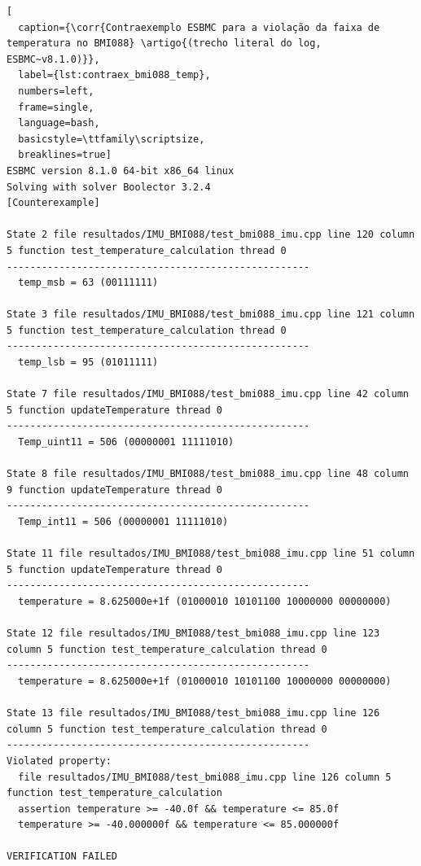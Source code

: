 \begin{lstlisting}[
  caption={\corr{Contraexemplo ESBMC para a violação da faixa de temperatura no BMI088} \artigo{(trecho literal do log, ESBMC~v8.1.0)}},
  label={lst:contraex_bmi088_temp},
  numbers=left,
  frame=single,
  language=bash,
  basicstyle=\ttfamily\scriptsize,
  breaklines=true]
ESBMC version 8.1.0 64-bit x86_64 linux
Solving with solver Boolector 3.2.4
[Counterexample]

State 2 file resultados/IMU_BMI088/test_bmi088_imu.cpp line 120 column 5 function test_temperature_calculation thread 0
----------------------------------------------------
  temp_msb = 63 (00111111)

State 3 file resultados/IMU_BMI088/test_bmi088_imu.cpp line 121 column 5 function test_temperature_calculation thread 0
----------------------------------------------------
  temp_lsb = 95 (01011111)

State 7 file resultados/IMU_BMI088/test_bmi088_imu.cpp line 42 column 5 function updateTemperature thread 0
----------------------------------------------------
  Temp_uint11 = 506 (00000001 11111010)

State 8 file resultados/IMU_BMI088/test_bmi088_imu.cpp line 48 column 9 function updateTemperature thread 0
----------------------------------------------------
  Temp_int11 = 506 (00000001 11111010)

State 11 file resultados/IMU_BMI088/test_bmi088_imu.cpp line 51 column 5 function updateTemperature thread 0
----------------------------------------------------
  temperature = 8.625000e+1f (01000010 10101100 10000000 00000000)

State 12 file resultados/IMU_BMI088/test_bmi088_imu.cpp line 123 column 5 function test_temperature_calculation thread 0
----------------------------------------------------
  temperature = 8.625000e+1f (01000010 10101100 10000000 00000000)

State 13 file resultados/IMU_BMI088/test_bmi088_imu.cpp line 126 column 5 function test_temperature_calculation thread 0
----------------------------------------------------
Violated property:
  file resultados/IMU_BMI088/test_bmi088_imu.cpp line 126 column 5 function test_temperature_calculation
  assertion temperature >= -40.0f && temperature <= 85.0f
  temperature >= -40.000000f && temperature <= 85.000000f

VERIFICATION FAILED
\end{lstlisting}


